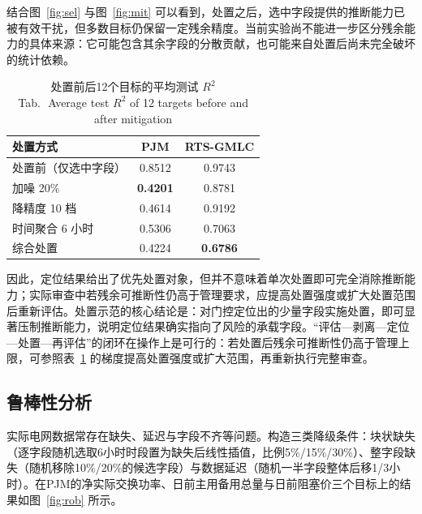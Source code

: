 \documentclass[UTF8,zihao=5,twoside,fontset=none]{ctexart}
\newcommand{\tabbicaption}[2]{\caption{#1\\[-0.2em]\small Tab.\,\thetable\ #2}}
\begin{document}
结合图~\ref{fig:sel} 与图~\ref{fig:mit} 可以看到，处置之后，选中字段提供的推断能力已被有效干扰，但多数目标仍保留一定残余精度。当前实验尚不能进一步区分残余能力的具体来源：它可能包含其余字段的分散贡献，也可能来自处置后尚未完全破坏的统计依赖。

\begin{table}[!t]
\centering
\tabbicaption{处置前后12个目标的平均测试 $R^2$}{Average test $R^2$ of 12 targets before and after mitigation}
\label{tab:mit}
\setlength{\tabcolsep}{4.0pt}
\begin{tabular}{lcc}
\toprule
处置方式 & PJM & RTS-GMLC \\
\midrule
处置前（仅选中字段） & 0.8512 & 0.9743 \\
\midrule
加噪 20\% & \textbf{0.4201} & 0.8781 \\
降精度 10 档 & 0.4614 & 0.9192 \\
时间聚合 6 小时 & 0.5306 & 0.7063 \\
综合处置 & 0.4224 & \textbf{0.6786} \\
\bottomrule
\end{tabular}
\end{table}

因此，定位结果给出了优先处置对象，但并不意味着单次处置即可完全消除推断能力；实际审查中若残余可推断性仍高于管理要求，应提高处置强度或扩大处置范围后重新评估。处置示范的核心结论是：对门控定位出的少量字段实施处置，即可显著压制推断能力，说明定位结果确实指向了风险的承载字段。“评估—剥离—定位—处置—再评估”的闭环在操作上是可行的：若处置后残余可推断性仍高于管理上限，可参照表~\ref{tab:mit} 的梯度提高处置强度或扩大范围，再重新执行完整审查。

\FloatBarrier

\subsection{鲁棒性分析}

实际电网数据常存在缺失、延迟与字段不齐等问题。构造三类降级条件：块状缺失（逐字段随机选取6小时时段置为缺失后线性插值，比例5\%/15\%/30\%）、整字段缺失（随机移除10\%/20\%的候选字段）与数据延迟（随机一半字段整体后移1/3小时）。在PJM的净实际交换功率、日前主用备用总量与日前阻塞价三个目标上的结果如图~\ref{fig:rob} 所示。
\end{document}
